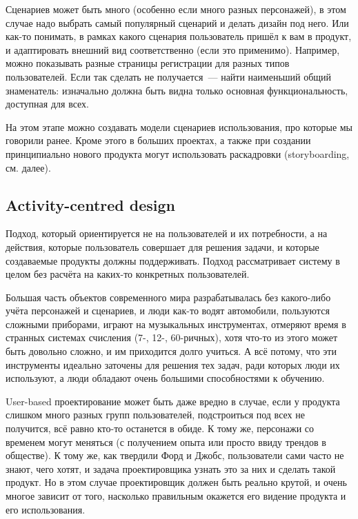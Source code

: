 \documentclass{../../text-style}
\begin{document}
Сценариев может быть много (особенно если много разных персонажей), в этом случае надо выбрать самый популярный сценарий и делать дизайн под него. Или как-то понимать, в рамках какого сценария пользователь пришёл к вам в продукт, и адаптировать внешний вид соответственно (если это применимо). Например, можно показывать разные страницы регистрации для разных типов пользователей. Если так сделать не получается~--- найти наименьший общий знаменатель: изначально должна быть видна только основная функциональность, доступная для всех.

На этом этапе можно создавать модели сценариев использования, про которые мы говорили ранее. Кроме этого в больших проектах, а также при создании принципиально нового продукта могут использовать раскадровки (storyboarding, см. далее).

\subsection{Activity-centred design}

Подход, который ориентируется не на пользователей и их потребности, а на действия, которые пользователь совершает для решения задачи, и которые создаваемые продукты должны поддерживать. Подход рассматривает систему в целом без расчёта на каких-то конкретных пользователей.

Большая часть объектов современного мира разрабатывалась без какого-либо учёта персонажей и сценариев, и люди как-то водят автомобили, пользуются сложными приборами, играют на музыкальных инструментах, отмеряют время в странных системах счисления (7-, 12-, 60-ричных), хотя что-то из этого может быть довольно сложно, и им приходится долго учиться. А всё потому, что эти инструменты идеально заточены для решения тех задач, ради которых люди их используют, а люди обладают очень большими способностями к обучению. 

User-based проектирование может быть даже вредно в случае, если у продукта слишком много разных групп пользователей, подстроиться под всех не получится, всё равно кто-то останется в обиде. К тому же, персонажи со временем могут меняться (с получением опыта или просто ввиду трендов в обществе). К тому же, как твердили Форд и Джобс, пользователи сами часто не знают, чего хотят, и задача проектировщика узнать это за них и сделать такой продукт. Но в этом случае проектировщик должен быть реально крутой, и очень многое зависит от того, насколько правильным окажется его видение продукта и его использования.
\end{document}
